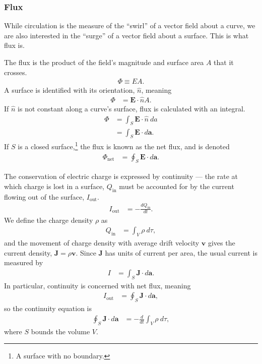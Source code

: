 \documentclass[10pt]{mypackage}
\begin{document}
\subsubsection{Flux}%
While circulation is the measure of the ``swirl'' of a vector field about a curve, we are also interested in the ``surge'' of a vector field about a surface. This is what flux is.
\begin{definition}[Flux]
The flux is the product of the field's magnitude and surface area $A$ that it crosses.
\begin{align*}
  \Phi \equiv EA.
\end{align*}
A surface is identified with its orientation, $\hat{n}$, meaning
\begin{align*}
  \Phi &= \mathbf{E}\cdot \hat{n} A.
\end{align*}
If $\hat{n}$ is not constant along a curve's surface, flux is calculated with an integral.
\begin{align*}
  \Phi &= \int_{S}^{} \mathbf{E}\cdot \hat{n}\:da\\
       &= \int_{S}^{} \mathbf{E}\cdot d\mathbf{a}.
\end{align*}
If $S$ is a closed surface,\footnote{A surface with no boundary.} the flux is known as the net flux, and is denoted
\begin{align*}
  \Phi_{\text{net}} &= \oint_{S}^{} \mathbf{E}\cdot d\mathbf{a}.
\end{align*}
\end{definition}
\begin{example}
  The conservation of electric charge is expressed by continuity --- the rate at which charge is lost in a surface, $Q_{\text{in}}$ must be accounted for by the current flowing out of the surface, $I_{\text{out}}$.
  \begin{align*}
    I_{\text{out}} &= -\frac{dQ_{\text{in}}}{dt}.
  \end{align*}
  We define the charge density $\rho$ as
  \begin{align*}
    Q_{\text{in}} &= \int_{V}^{} \rho\:d\tau,
  \end{align*}
  and the movement of charge density with average drift velocity $\mathbf{v}$ gives the current density, $\mathbf{J} = \rho \mathbf{v}$. Since $\mathbf{J}$ has units of current per area, the usual current is measured by
  \begin{align*}
    I &= \int_{S}^{} \mathbf{J}\cdot d\mathbf{a}.
  \end{align*}
  In particular, continuity is concerned with net flux, meaning
  \begin{align*}
    I_{\text{out}} &= \oint_{S}^{} \mathbf{J} \cdot d\mathbf{a},
  \end{align*}
  so the continuity equation is
  \begin{align*}
    \oint_{S}^{} \mathbf{J}\cdot d\mathbf{a} &= -\frac{d}{dt}\int_{V}^{} \rho\:d\tau,
  \end{align*}
  where $S$ bounds the volume $V$.
\end{example}
\end{document}
